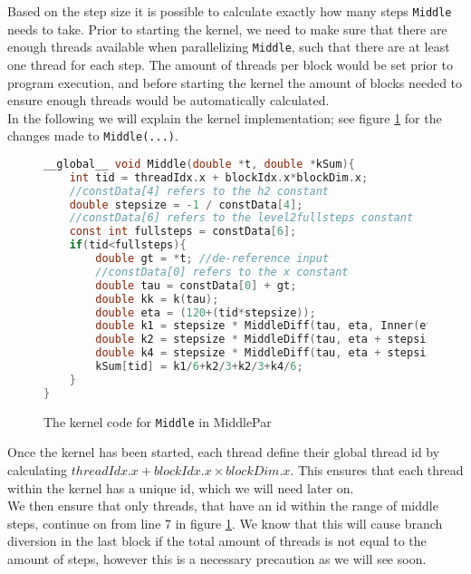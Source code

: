 Based on the step size it is possible to calculate exactly how many steps \texttt{Middle} needs to take. Prior to starting the kernel, we need to make sure that there are enough threads available when parallelizing \texttt{Middle}, such that there are at least one thread for each step. The amount of threads per block would be set prior to program execution, and before starting the kernel the amount of blocks needed to ensure enough threads would be automatically calculated.\\

In the following we will explain the kernel implementation; see figure \ref{fig:middlepar} for the changes made to \texttt{Middle(...)}. \\
\begin{figure}[H]
\begin{lstlisting}[language=c]
__global__ void Middle(double *t, double *kSum){
	int tid = threadIdx.x + blockIdx.x*blockDim.x;
	//constData[4] refers to the h2 constant
	double stepsize = -1 / constData[4]; 
	//constData[6] refers to the level2fullsteps constant
	const int fullsteps = constData[6]; 
	if(tid<fullsteps){
		double gt = *t; //de-reference input
		//constData[0] refers to the x constant
		double tau = constData[0] + gt; 
		double kk = k(tau);
		double eta = (120+(tid*stepsize));
		double k1 = stepsize * MiddleDiff(tau, eta, Inner(eta, gt, kk).y);
		double k2 = stepsize * MiddleDiff(tau, eta + stepsize/2, Inner(eta + stepsize/2, gt, kk).y);		
		double k4 = stepsize * MiddleDiff(tau, eta + stepsize, Inner(eta + stepsize, gt, kk).y);
		kSum[tid] = k1/6+k2/3+k2/3+k4/6;
	}
}
\end{lstlisting}
\caption{The kernel code for \texttt{Middle} in MiddlePar}
\label{fig:middlepar}
\end{figure}

Once the kernel has been started, each thread define their global thread id by calculating $threadIdx.x + blockIdx.x \times blockDim.x$. This ensures that each thread within the kernel has a unique id, which we will need later on.\\

We then ensure that only threads, that have an id within the range of middle steps, continue on from line 7 in figure \ref{fig:middlepar}. We know that this will cause branch diversion in the last block if the total amount of threads is not equal to the amount of steps, however this is a necessary precaution as we will see soon.\\

